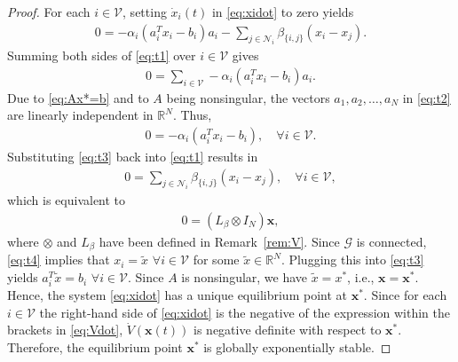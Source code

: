 \documentclass[11pt]{article}
\theoremstyle{plain}
\theoremstyle{definition}
\theoremstyle{remark}
\begin{document}
\begin{proof}
For each $i\in\mathcal{V}$, setting $\dot{x}_i(t)$ in \eqref{eq:xidot} to zero yields
\begin{align}
0=-\alpha_i(a_i^Tx_i-b_i)a_i-\sum_{j\in\mathcal{N}_i}\beta_{\{i,j\}}(x_i-x_j).\label{eq:t1}
\end{align}
Summing both sides of \eqref{eq:t1} over $i\in\mathcal{V}$ gives
\begin{align}
0=\sum_{i\in\mathcal{V}}-\alpha_i(a_i^Tx_i-b_i)a_i.\label{eq:t2}
\end{align}
Due to \eqref{eq:Ax*=b} and to $A$ being nonsingular, the vectors $a_1,a_2,\ldots,a_N$ in \eqref{eq:t2} are linearly independent in $\mathbb{R}^N$. Thus,
\begin{align}
0=-\alpha_i(a_i^Tx_i-b_i),\quad\forall i\in\mathcal{V}.\label{eq:t3}
\end{align}
Substituting \eqref{eq:t3} back into \eqref{eq:t1} results in
\begin{align*}
0=\sum_{j\in\mathcal{N}_i}\beta_{\{i,j\}}(x_i-x_j),\quad\forall i\in\mathcal{V},
\end{align*}
which is equivalent to
\begin{align}
0=(L_\beta\otimes I_N)\mathbf{x},\label{eq:t4}
\end{align}
where $\otimes$ and $L_\beta$ have been defined in Remark~\ref{rem:V}. Since $\mathcal{G}$ is connected, \eqref{eq:t4} implies that $x_i=\tilde{x}$ $\forall i\in\mathcal{V}$ for some $\tilde{x}\in\mathbb{R}^N$. Plugging this into \eqref{eq:t3} yields $a_i^T\tilde{x}=b_i$ $\forall i\in\mathcal{V}$. Since $A$ is nonsingular, we have $\tilde{x}=x^*$, i.e., $\mathbf{x}=\mathbf{x}^*$. Hence, the system \eqref{eq:xidot} has a unique equilibrium point at $\mathbf{x}^*$. Since for each $i\in\mathcal{V}$ the right-hand side of \eqref{eq:xidot} is the negative of the expression within the brackets in \eqref{eq:Vdot}, $\dot{V}(\mathbf{x}(t))$ is negative definite with respect to $\mathbf{x}^*$. Therefore, the equilibrium point $\mathbf{x}^*$ is globally exponentially stable.
\end{proof}
\end{document}
